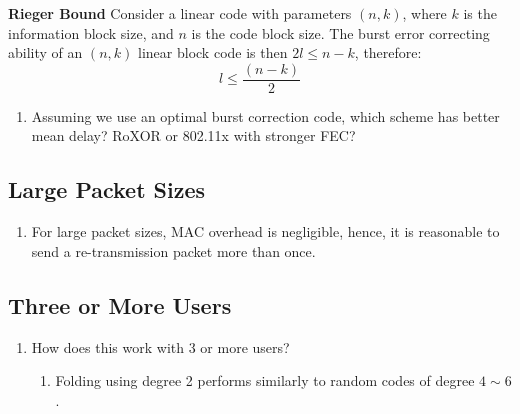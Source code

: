 \textbf{Rieger Bound} Consider a linear code with parameters $(n,k)$, where $k$ is the information block size, and $n$ is the code block size. The burst error correcting ability of an $(n,k)$ linear block code is then $2l \leq n-k$, therefore:
\begin{equation}
l \leq \frac{(n-k)}{2}
\end{equation}

\begin{enumerate}
    \item Assuming we use an optimal burst correction code, which scheme has better mean delay? RoXOR or 802.11x with stronger FEC?
\end{enumerate}

\subsection{Large Packet Sizes}
\label{sec:large_packet}

\begin{enumerate}
    \item For large packet sizes, MAC overhead is negligible, hence, it is reasonable to send a re-transmission packet more than once.
\end{enumerate}

\subsection{Three or More Users}
\label{sec:three_users}

\begin{enumerate}
	\item How does this work with 3 or more users?
	\begin{enumerate}
		\item Folding using degree 2 performs similarly to random codes of degree $4\sim6$.
	\end{enumerate}

 \end{enumerate}

